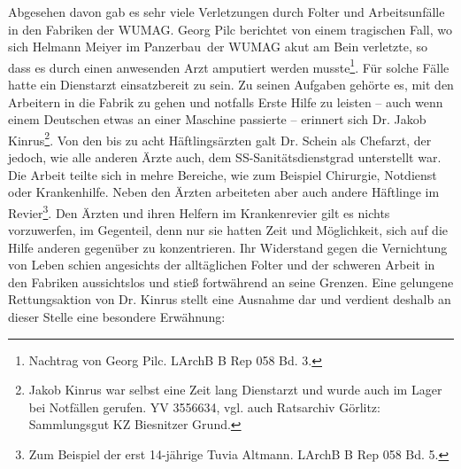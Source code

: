 \newline
Abgesehen davon gab es sehr viele Verletzungen durch Folter und Arbeitsunfälle in den Fabriken der WUMAG. Georg Pilc berichtet von einem tragischen Fall, wo sich Helmann Meiyer im \glqq Panzerbau\grqq~der WUMAG akut am Bein verletzte, so dass es durch einen anwesenden Arzt amputiert werden musste\footnote{Nachtrag von Georg Pilc. LArchB B Rep 058 Bd. 3.}.
Für solche Fälle hatte ein Dienstarzt einsatzbereit zu sein.
Zu seinen Aufgaben gehörte es, mit den Arbeitern in die Fabrik zu gehen und notfalls Erste Hilfe zu leisten -- auch wenn einem Deutschen etwas an einer Maschine passierte -- erinnert sich Dr. Jakob Kinrus\footnote{Jakob Kinrus war selbst eine Zeit lang Dienstarzt und wurde auch im Lager bei Notfällen gerufen. YV 3556634, vgl. auch Ratsarchiv Görlitz: Sammlungsgut KZ Biesnitzer Grund.}.\newline
Von den bis zu acht Häftlingsärzten galt Dr. Schein als Chefarzt, der jedoch, wie alle anderen Ärzte auch, dem SS-Sanitätsdienstgrad unterstellt war. Die Arbeit teilte sich in mehre Bereiche, wie zum Beispiel Chirurgie, Notdienst oder Krankenhilfe. Neben den Ärzten arbeiteten aber auch andere Häftlinge im Revier\footnote{Zum Beispiel der erst 14-jährige Tuvia Altmann. LArchB B Rep 058 Bd. 5.}.
\newline
Den Ärzten und ihren Helfern im Krankenrevier gilt es nichts vorzuwerfen, im Gegenteil, denn nur sie hatten Zeit und Möglichkeit, sich auf die Hilfe anderen gegenüber zu konzentrieren. Ihr Widerstand gegen die Vernichtung von Leben schien angesichts der alltäglichen Folter und der schweren Arbeit in den Fabriken aussichtslos und stieß fortwährend an seine Grenzen. Eine gelungene Rettungsaktion von Dr. Kinrus stellt eine Ausnahme dar und verdient deshalb an dieser Stelle eine besondere Erwähnung:

